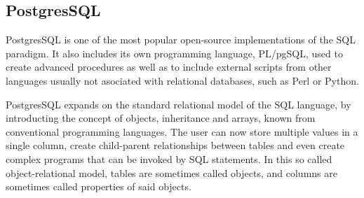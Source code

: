 \subsection{PostgresSQL}
\label{subsec:background:first_section:second_subsection}
\par PostgresSQL is one of the most popular open-source implementations of the SQL paradigm\citep{worsleyPostgresSQL}. It also includes its own programming language, PL/pgSQL, used to create advanced procedures as well as to include external scripts from other languages usually not asociated with relational databases, such as Perl or Python. 

\par PostgresSQL expands on the standard relational model of the SQL language, by introducting the concept of objects, inheritance and arrays, known from conventional programming languages. The user can now store multiple values in a single column, create child-parent relationships between tables and even create complex programs that can be invoked by SQL statements. In this so called object-relational model, tables are sometimes called objects, and columns are sometimes called properties of said objects\citep{ACID}.

